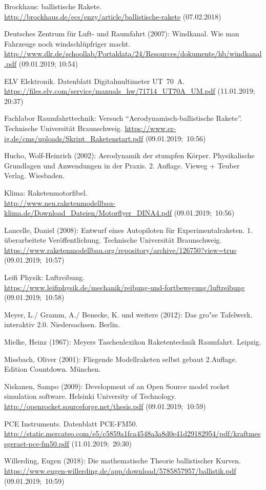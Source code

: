 \documentclass[10pt,a4paper]{article}
\begin{document}
\newpage
\begin{thebibliography}{99}
	Brockhaus: ballistische Rakete. \\
	\url{http://brockhaus.de/ecs/enzy/article/ballistische-rakete} (07.02.2018)
	
	Deutsches Zentrum für Luft- und Raumfahrt (2007): Windkanal. Wie man Fahrzeuge noch windschlüpfriger macht.\\
	\url{http://www.dlr.de/schoollab/Portaldata/24/Resources/dokumente/hb/windkanal.pdf} (09.01.2019; 10:54)
	
	ELV Elektronik. Datenblatt Digitalmultimeter UT~70~A.
	\url{https://files.elv.com/service/manuals_hw/71714_UT70A_UM.pdf} (11.01.2019; 20:37)
	
	Fachlabor Raumfahrttechnik: Versuch "`Aerodynamisch-ballistische Rakete"'. Technische Universität Braunschweig.
	\url{https://www.er-ig.de/cms/uploads/Skript_Raketenstart.pdf} (09.01.2019;~10:56)
	
	Hucho, Wolf-Heinrich (2002): Aerodynamik der stumpfen Körper. Physikalische Grundlagen und Anwendungen in der Praxis. 2. Auflage. Vieweg + Teuber Verlag. Wiesbaden.
	
	Klima: Raketenmotorfibel. \\
	\url{http://www.neu.raketenmodellbau-klima.de/Download_Dateien/Motorflyer_DINA4.pdf} (09.01.2019;~10:56)
	
	Lancelle, Daniel (2008): Entwurf eines Autopiloten für Experimentalraketen. 1. überarbeitete Veröffentlichung.
	Technische Universität Braunschweig.
	\url{https://www.raketenmodellbau.org/repository/archive/126750?view=true} (09.01.2019;~10:57)
	
	Leifi Physik: Luftreibung.\\ \url{https://www.leifiphysik.de/mechanik/reibung-und-fortbewegung/luftreibung} (09.01.2019;~10:58)
	
	Meyer, L./ Gramm, A./ Benecke, K. und weitere (2012): Das gro"se Tafelwerk. interaktiv 2.0. Niedersachsen. Berlin. 
	
	Mielke, Heinz (1967): Meyers Taschenlexikon Raketentechnik Raumfahrt. Leipzig. 
	
	Missbach, Oliver (2001): Fliegende Modellraketen selbst gebaut 2.Auflage. Edition Countdown. München. 
	
	Niskanen, Sampo (2009): Development of an Open Source model rocket simulation software. Helsinki University of Technology. \url{http://openrocket.sourceforge.net/thesis.pdf} (09.01.2019;~10:59)
	
	PCE Instruments. Datenblatt PCE-FM50. \\
	\url{http://static.mercateo.com/e5/c5859a1fca4548a3a8d0e41d29182954/pdf/kraftmessgeraet-pce-fm50.pdf} (11.01.2019;~20:30)
	
	Willerding, Eugen (2018): Die mathematische Theorie ballistischer Kurven.\\ \url{https://www.eugen-willerding.de/app/download/5785857957/ballistik.pdf} (09.01.2019;~10:59)
\end{thebibliography}
\end{document}
